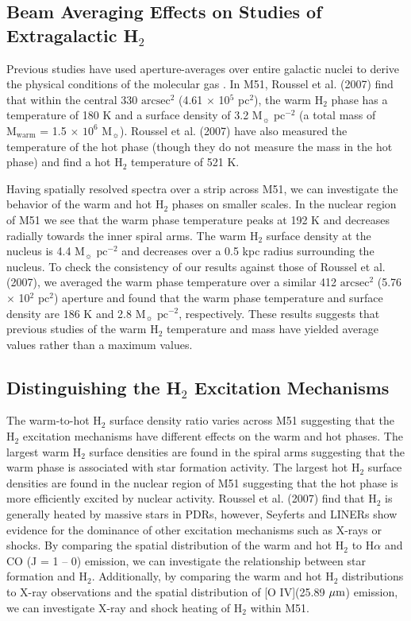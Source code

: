 \documentclass[manuscript]{aastex}
\begin{document}
\subsection{Beam Averaging Effects on Studies of Extragalactic H$_2$}

Previous studies have used aperture-averages over entire galactic
nuclei to derive the physical conditions of the molecular gas
\citep{rig02, hig06, rou07}.  In M51, Roussel et al. (2007) find that within
the central 330 $\mathrm{arcsec^2}$ (4.61 $\times$ 10$^5$ pc$^2$),
the warm H$_2$ phase has a temperature of 180 K and 
a surface density of 3.2 $\mathrm{M_\sun}$ $\mathrm{pc^{-2}}$ 
(a total mass of $\mathrm{M_{warm}}$ = 1.5 $\times$ $\mathrm{10^6}$
$\mathrm{M_\sun}$).  Roussel et al. (2007) have also measured the temperature of
the hot phase (though they do not measure the mass in the hot phase)
and find a hot H$_2$ temperature of 521 K.

Having spatially resolved spectra over a strip across M51, we can 
investigate the behavior of the warm and hot H$_2$ phases 
on smaller scales.  In the nuclear region of M51 we see that the 
warm phase temperature peaks at 192 K and decreases 
radially towards the inner spiral arms.  The warm H$_2$ surface 
density at the nucleus is 4.4 $\mathrm{M_\sun}$ $\mathrm{pc^{-2}}$ 
and decreases over a 0.5 kpc radius surrounding the 
nucleus.  To check the consistency of 
our results against those of Roussel et al. (2007), we averaged the 
warm phase temperature over a similar 412 
$\mathrm{arcsec^2}$ (5.76 $\times$ 10$^2$ pc$^2$) aperture and
found that the warm phase temperature and surface density are
186 K and 2.8 $\mathrm{M_\sun}$ $\mathrm{pc^{-2}}$, 
respectively.  These results suggests that previous studies 
of the warm H$_2$ temperature and mass have yielded average 
values rather than a maximum values.

\subsection{Distinguishing the H$_2$ Excitation Mechanisms}

The warm-to-hot H$_2$ surface density ratio varies across 
M51 suggesting that the H$_2$ excitation mechanisms 
have different effects on the warm and hot phases. 
The largest warm H$_2$ surface densities are found in 
the spiral arms suggesting that the warm phase is 
associated with star formation activity.  The largest 
hot H$_2$ surface densities are found in the nuclear 
region of M51 suggesting that the hot phase is more 
efficiently excited by nuclear activity. Roussel et al. (2007) 
find that H$_2$ is generally heated by massive stars in 
PDRs, however, Seyferts and LINERs show evidence for 
the dominance of other excitation mechanisms such as 
X-rays or shocks.  By comparing the spatial distribution 
of the warm and hot H$_2$ to H$\alpha$ and CO 
(J = 1 -- 0) emission, we can investigate the relationship 
between star formation and H$_2$.  Additionally, by 
comparing the warm and hot H$_2$ distributions to X-ray 
observations and the spatial distribution of [O IV](25.89 $\mbox{$\mu$m}$) 
emission, we can investigate X-ray and shock heating 
of H$_2$ within M51.
\end{document}

